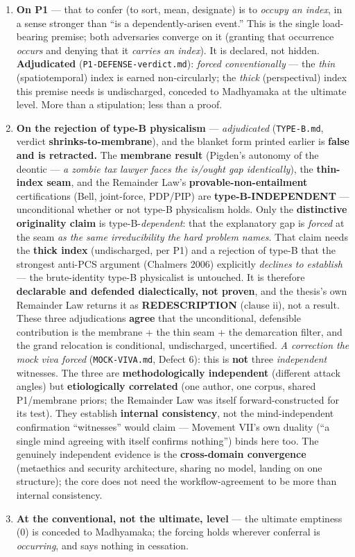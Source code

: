 \documentclass[11pt]{article}
\begin{document}
\begin{enumerate}
\item \textbf{On P1} — that to confer (to sort, mean, designate) is to \emph{occupy an index}, in a sense stronger than ``is a dependently-arisen event.'' This is the single load-bearing premise; both adversaries converge on it (granting that occurrence \emph{occurs} and denying that it \emph{carries an index}). It is declared, not hidden. \textbf{Adjudicated} (\texttt{P1-DEFENSE-verdict.md}): \emph{forced conventionally} — the \emph{thin} (spatiotemporal) index is earned non-circularly; the \emph{thick} (perspectival) index this premise needs is undischarged, conceded to Madhyamaka at the ultimate level. More than a stipulation; less than a proof.
\item \textbf{On the rejection of type-B physicalism} — \emph{adjudicated} (\texttt{TYPE-B.md}, verdict \textbf{shrinks-to-membrane}), and the blanket form printed earlier is \textbf{false and is retracted.} The \textbf{membrane result} (Pigden's autonomy of the deontic — \emph{a zombie tax lawyer faces the is/\allowbreak{}ought gap identically}), the \textbf{thin-index seam}, and the Remainder Law's \textbf{provable-non-entailment} certifications (Bell, joint-force, PDP/\allowbreak{}PIP) are \textbf{type-B-INDEPENDENT} — unconditional whether or not type-B physicalism holds. Only the \textbf{distinctive originality claim} is type-B-\emph{dependent}: that the explanatory gap is \emph{forced} at the seam \emph{as the same irreducibility the hard problem names}. That claim needs the \textbf{thick index} (undischarged, per P1) and a rejection of type-B that the strongest anti-PCS argument (Chalmers 2006) explicitly \emph{declines to establish} — the brute-identity type-B physicalist is untouched. It is therefore \textbf{declarable and defended dialectically, not proven}, and the thesis's own Remainder Law returns it as \textbf{REDESCRIPTION} (clause ii), not a result. These three adjudications \textbf{agree} that the unconditional, defensible contribution is the membrane + the thin seam + the demarcation filter, and the grand relocation is conditional, undischarged, uncertified. \emph{A correction the mock viva forced} (\texttt{MOCK-VIVA.md}, Defect 6): this is \textbf{not} three \emph{independent} witnesses. The three are \textbf{methodologically independent} (different attack angles) but \textbf{etiologically correlated} (one author, one corpus, shared P1/\allowbreak{}membrane priors; the Remainder Law was itself forward-constructed for its test). They establish \textbf{internal consistency}, not the mind-independent confirmation ``witnesses'' would claim — Movement VII's own duality (``a single mind agreeing with itself confirms nothing'') binds here too. The genuinely independent evidence is the \textbf{cross-domain convergence} (metaethics and security architecture, sharing no model, landing on one structure); the core does not need the workflow-agreement to be more than internal consistency.
\item \textbf{At the conventional, not the ultimate, level} — the ultimate emptiness (0) is conceded to Madhyamaka; the forcing holds wherever conferral is \emph{occurring}, and says nothing in cessation.
\end{enumerate}
\end{document}
